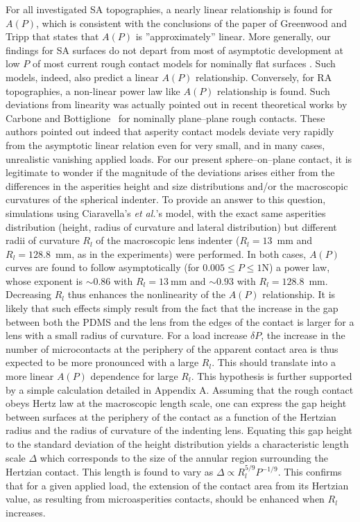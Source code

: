 \documentclass[pre,groupedaddress,showkeys,showpacs,twocolumn]{revtex4}
\begin{document}
For all investigated SA topographies, a nearly linear relationship is found for $A(P)$, which is consistent with the conclusions of the paper of Greenwood and Tripp\cite{greenwood1967} that states that $A(P)$ is ''approximately'' linear. More generally, our findings for SA surfaces do not depart from most of asymptotic development at low $P$ of most current rough contact models for nominally flat surfaces \cite{campana2008}. Such models, indeed, also predict a linear $A(P)$ relationship. Conversely, for RA topographies, a non-linear power law like $A(P)$ relationship is found. Such deviations from linearity was actually pointed out in recent theoretical works by Carbone and Bottiglione~\cite{carbone2008} for nominally plane--plane rough contacts. These authors pointed out indeed that asperity contact models deviate very rapidly from the asymptotic linear relation even for very small, and in many cases, unrealistic vanishing applied loads. For our present sphere--on--plane contact, it is legitimate to wonder 
if the 
magnitude of the deviations arises either from the differences in the asperities height and size distributions and/or the macroscopic curvatures of the spherical indenter. To provide an answer to this question, simulations using Ciaravella's \textit{et al.}'s model, with the exact same asperities distribution (height, radius of curvature and lateral distribution) but different radii of curvature $R_l$ of the macroscopic lens indenter ($R_l=13$~mm and $R_l=128.8$~mm, as in the experiments) were performed. In both cases, $A(P)$ curves are found to follow asymptotically (for $0.005 \le P \le 1$N) a power law, whose exponent is $\sim 0.86$ with $R_l=13~$mm and $\sim 0.93$ with $R_l=128.8$~mm. Decreasing $R_l$ thus enhances the nonlinearity of the $A(P)$ relationship. It is likely that such effects simply result from the fact that the increase in the gap between both the PDMS and the lens from the edges of the contact is larger for a lens with a small radius of curvature. For a load increase $\delta P$, the 
increase in the 
number of microcontacts at the periphery of the apparent contact area is thus expected to be more pronounced with a large $R_l$. This should translate into a more linear $A(P)$ dependence for large $R_l$. This hypothesis is further supported by a simple calculation detailed in Appendix A. Assuming that the rough contact obeys Hertz law at the macroscopic length scale, one can express the gap height between surfaces at the periphery of the contact as a function of the Hertzian radius and the radius of curvature of the indenting lens. Equating this gap height to the standard deviation of the height distribution yields a characteristic length scale $\Delta$ which corresponds to the size of the annular region surrounding the Hertzian contact. This length is found to vary as $\Delta \propto R_l^{5/9}P^{-1/9}$. This confirms that for a given applied load, the extension of the contact area from its Hertzian value, as resulting from microasperities contacts, should be enhanced when $R_l$ increases.\\
\end{document}
